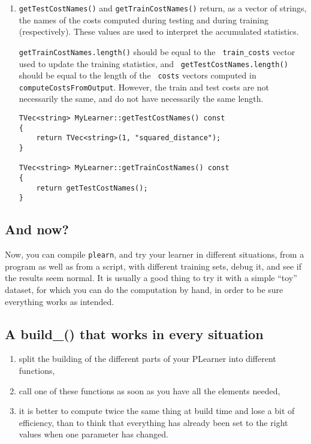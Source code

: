 \documentclass[11pt]{book}
\begin{document}
\begin{enumerate}
\item {\tt getTestCostNames()} and {\tt getTrainCostNames()} return, as
a vector of strings, the names of the costs computed during testing and
during training (respectively). These values are used to interpret the
accumulated statistics.

{\tt getTrainCostNames.length()} should be equal to the {\tt
train\_costs} vector used to update the training statistics, and {\tt
getTestCostNames.length()} should be equal to the length of the {\tt
costs} vectors computed in {\tt computeCostsFromOutput}. However, the
train and test costs are not necessarily the same, and do not have
necessarily the same length.
\begin{verbatim}
TVec<string> MyLearner::getTestCostNames() const
{
    return TVec<string>(1, "squared_distance");
}

TVec<string> MyLearner::getTrainCostNames() const
{
    return getTestCostNames();
}
\end{verbatim}

\end{enumerate}

\subsection{And now?}
Now, you can compile {\tt plearn}, and try your learner in different
situations, from a program as well as from a script, with different
training sets, debug it, and see if the results seem normal. It is
usually a good thing to try it with a simple ``toy'' dataset, for
which you can do the computation by hand, in order to be sure everything
works as intended.

\subsection{\label{plearner_build_}A build\_() that works in every situation}

\begin{enumerate}

\item split the building of the different parts of your PLearner into
different functions,

\item call one of these functions as soon as you have all the elements needed,

\item it is better to compute twice the same thing at build time and
lose a bit of efficiency, than to think that everything has already been
set to the right values when one parameter has changed.

\end{enumerate}
\end{document}
